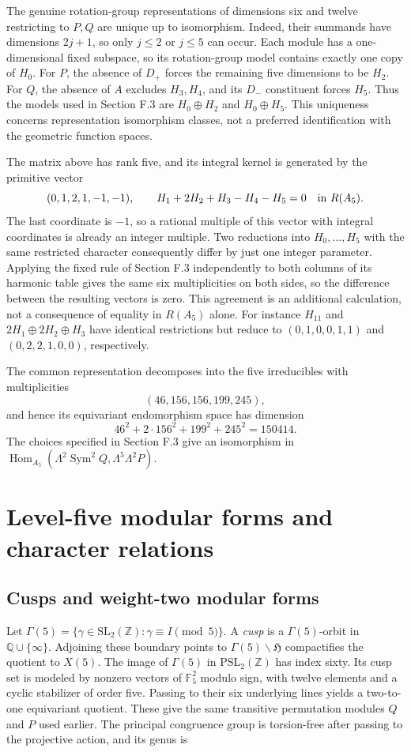 \documentclass[11pt,a4paper]{article}
\begin{document}
The genuine rotation-group representations of dimensions six and twelve restricting to $P,Q$ are unique up to isomorphism. Indeed, their summands have dimensions $2j+1$, so only $j\leq2$ or $j\leq5$ can occur. Each module has a one-dimensional fixed subspace, so its rotation-group model contains exactly one copy of $H_0$. For $P$, the absence of $D_+$ forces the remaining five dimensions to be $H_2$. For $Q$, the absence of $A$ excludes $H_3,H_4$, and its $D_-$ constituent forces $H_5$. Thus the models used in Section F.3 are $H_0\oplus H_2$ and $H_0\oplus H_5$. This uniqueness concerns representation isomorphism classes, not a preferred identification with the geometric function spaces.

The matrix above has rank five, and its integral kernel is generated by the primitive vector
\[
(0,1,2,1,-1,-1),
\qquad
H_1+2H_2+H_3-H_4-H_5=0\quad\hbox{in }R(A_5).
\]
The last coordinate is $-1$, so a rational multiple of this vector with integral coordinates is already an integer multiple. Two reductions into $H_0,\ldots,H_5$ with the same restricted character consequently differ by just one integer parameter. Applying the fixed rule of Section F.3 independently to both columns of its harmonic table gives the same six multiplicities on both sides, so the difference between the resulting vectors is zero. This agreement is an additional calculation, not a consequence of equality in $R(A_5)$ alone. For instance $H_{11}$ and $2H_1\oplus2H_2\oplus H_3$ have identical restrictions but reduce to $(0,1,0,0,1,1)$ and $(0,2,2,1,0,0)$, respectively.

The common representation decomposes into the five irreducibles with multiplicities
\[
(46,156,156,199,245),
\]
and hence its equivariant endomorphism space has dimension
\[
46^2+2\cdot156^2+199^2+245^2=150414.
\]
The choices specified in Section F.3 give an isomorphism in \(\operatorname{Hom}_{A_5}(\Lambda^2\operatorname{Sym}^2Q,\Lambda^5\Lambda^2P)\).

\section{Level-five modular forms and character relations}\label{sec:modular}

\subsection{Cusps and weight-two modular forms}\label{subsec:G1}

Let $\Gamma(5)=\{\gamma\in\mathrm{SL}_2(\mathbb Z):\gamma\equiv I\pmod5\}$. A \emph{cusp} is a $\Gamma(5)$-orbit in $\mathbb Q\cup\{\infty\}$. Adjoining these boundary points to $\Gamma(5)\backslash\mathfrak H$ compactifies the quotient to $X(5)$. The image of $\Gamma(5)$ in $\mathrm{PSL}_2(\mathbb Z)$ has index sixty. Its cusp set is modeled by nonzero vectors of \(\mathbb F_5^2\) modulo sign, with twelve elements and a cyclic stabilizer of order five. Passing to their six underlying lines yields a two-to-one equivariant quotient. These give the same transitive permutation modules \(Q\) and \(P\) used earlier. The principal congruence group is torsion-free after passing to the projective action, and its genus is
\end{document}
